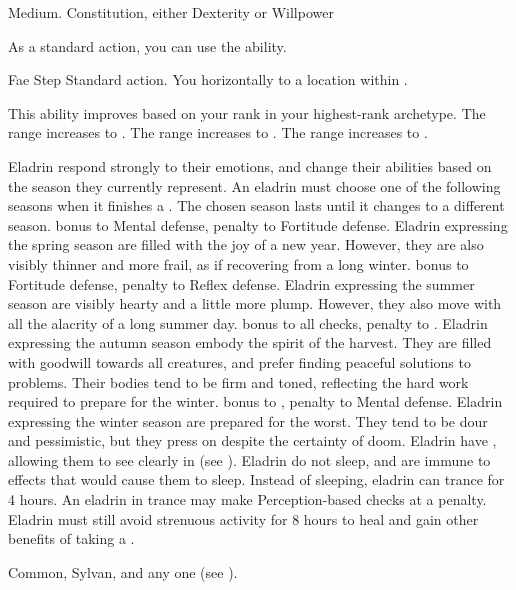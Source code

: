      Medium.
      Constitution, either  Dexterity or  Willpower
    \begin{raggeditemize}
         As a standard action, you can use the  ability.
        \begin{magicalactiveability}{Fae Step}
            \abilityusagetime Standard action.
            \rankline
            You  horizontally to a location within \shortrange.

            \rankline
            This ability improves based on your rank in your highest-rank archetype.
             The range increases to \medrange.
             The range increases to \longrange.
             The range increases to \distrange.
        \end{magicalactiveability}
         Eladrin respond strongly to their emotions, and change their abilities based on the season they currently represent.
            An eladrin must choose one of the following seasons when it finishes a .
            The chosen season lasts until it changes to a different season.
              bonus to Mental defense,  penalty to Fortitude defense.
            Eladrin expressing the spring season are filled with the joy of a new year.
            However, they are also visibly thinner and more frail, as if recovering from a long winter.
              bonus to Fortitude defense,  penalty to Reflex defense.
            Eladrin expressing the summer season are visibly hearty and a little more plump.
            However, they also move with all the alacrity of a long summer day.
              bonus to all checks,  penalty to .
            Eladrin expressing the autumn season embody the spirit of the harvest.
            They are filled with goodwill towards all creatures, and prefer finding peaceful solutions to problems.
            Their bodies tend to be firm and toned, reflecting the hard work required to prepare for the winter.
              bonus to ,  penalty to Mental defense.
            Eladrin expressing the winter season are prepared for the worst.
            They tend to be dour and pessimistic, but they press on despite the certainty of doom.
         Eladrin have , allowing them to see clearly in  (see ).
         Eladrin do not sleep, and are immune to \magical effects that would cause them to sleep.
            Instead of sleeping, eladrin can trance for 4 hours.
            An eladrin in trance may make Perception-based checks at a  penalty.
            Eladrin must still avoid strenuous activity for 8 hours to heal and gain other benefits of taking a .
    \end{raggeditemize}
     Common, Sylvan, and any one  (see ).

